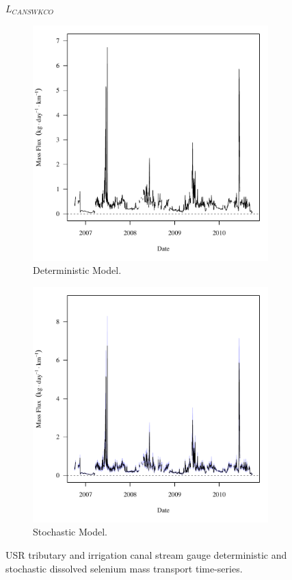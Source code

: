 \begin{landscape}
	\begin{figure}
		$ \displaystyle L_{CANSWKCO} $
		\begin{subfigure}{0.7\textwidth}
			\centering
			\includegraphics[width=\tableCustomSize]{"Figures/Results_USR/Deterministic/f CAN"}
			\caption{Deterministic Model.}
		\end{subfigure}%
		\begin{subfigure}{0.7\textwidth}
			\centering
			\includegraphics[width=\tableCustomSize]{"Figures/Results_USR/Stochastic/f CAN"}
			\caption{Stochastic Model.}
		\end{subfigure}
		\caption{USR tributary and irrigation canal stream gauge deterministic and stochastic dissolved selenium mass transport time-series.}
	\end{figure}
\end{landscape}
